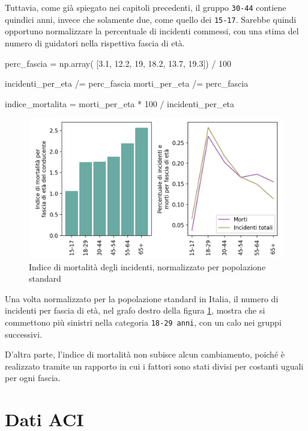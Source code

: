 \documentclass[a4paper,12pt]{report}
\newcommand{\columnstyle}[1]{\texttt{#1}}
\begin{document}
Tuttavia, come già spiegato nei capitoli precedenti, il gruppo \columnstyle{30-44} 
contiene quindici anni, invece che solamente due, come quello dei \columnstyle{15-17}. 
Sarebbe quindi opportuno 
normalizzare la percentuale di incidenti commessi, con una stima del numero di 
guidatori nella rispettiva fascia di età.

\begin{code}
perc_fascia = np.array( [3.1, 12.2, 19, 18.2, 13.7, 19.3]) / 100

incidenti_per_eta /= perc_fascia
morti_per_eta /= perc_fascia

indice_mortalita = morti_per_eta * 100 / incidenti_per_eta
\end{code}

\begin{figure}
    \includegraphics[width=\linewidth]{../src/incidenti/incidenti_senza_coords/mortalita/indice_mort_norm.png}
    \caption{Indice di mortalità degli incidenti, normalizzato per popolazione standard}
    \label{fig:indice-mort-norm}
\end{figure}

Una volta normalizzato per la popolazione standard in Italia, il numero di incidenti per 
fascia di età, nel grafo destro della figura \ref{fig:indice-mort-norm}, mostra che  
si commettono più sinistri nella categoria \columnstyle{18-29 anni}, 
con un calo nei gruppi successivi. 

D'altra parte, l'indice di mortalità non subisce alcun cambiamento, 
poiché è realizzato tramite 
un rapporto in cui i fattori sono stati divisi per costanti uguali per ogni fascia.

\section{Dati ACI}
\end{document}
